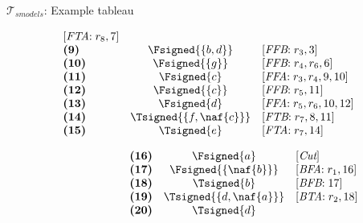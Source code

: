 \begin{frame}{$\mathcal{T}_{\textit{smodels}}$: Example tableau}
\begin{center}
\begin{minipage}[t]{16cm}
\begin{minipage}[t]{4.5cm}
\[\begin{array}{lcl}
  [\textit{FTA}{:}\;r_8, \text{7}]                 \\
\textbf{(9)}                                       &
  \Fsigned{\{b,d\}}                                &
  [\textit{FFB}{:}\;r_3, \text{3}]                 \\
\textbf{(10)}                                      &
  \Fsigned{\{g\}}                                  &
  [\textit{FFB}{:}\;r_4, r_6, \text{6}]            \\
\textbf{(11)}                                      &
  \Fsigned{c}                                      &
  [\textit{FFA}{:}\;r_3,r_4, \text{9}, \text{10}]  \\
\textbf{(12)}                                      &
  \Fsigned{\{c\}}                                  &
  [\textit{FFB}{:}\;r_5, \text{11}]                \\
\textbf{(13)}                                      &
  \Fsigned{d}                                      &
  [\textit{FFA}{:}\;r_5,r_6, \text{10}, \text{12}] \\
\textbf{(14)}                                      &
  \Tsigned{\{f,\naf{c}\}}                   &
  [\textit{FTB}{:}\;r_7, \text{8}, \text{11}]      \\
\textbf{(15)}                                      &
  \Tsigned{e}                                      &
  [\textit{FTA}{:}\;r_7, \text{14}]
\end{array}
\]
\end{minipage}
\begin{minipage}[t]{6cm}
\[
\hspace{2.2cm}
\begin{array}{lcl}
\textbf{(16)}                                      &
  \Fsigned{a}                                      &
  [\textit{Cut}]                                   \\
\textbf{(17)}                                      &
  \Fsigned{\{\naf{b}\}}                     &
  [\textit{BFA}{:}\; r_1, \text{16}]               \\
\textbf{(18)}                                      &
  \Tsigned{b}                                      &
  [\textit{BFB}{:}\; \text{17}]                    \\
\textbf{(19)}                                      &
  \Tsigned{\{d,\naf{a}\}}                   &
  [\textit{BTA}{:}\;r_2, \text{18}]                \\
\textbf{(20)}                                      &
  \Tsigned{d}                                      &

\end{array}\]
\end{minipage}
\end{minipage}
\end{center}
\end{frame}
